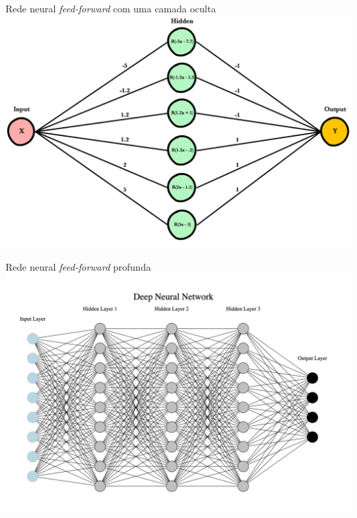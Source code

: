 \documentclass[11pt]{beamer}
\begin{document}
\begin{frame}{Rede neural \textit{feed-forward} com uma camada oculta}
\centering 
\includegraphics[scale=0.25]{graficos/single_layer.png}
\end{frame}

\begin{frame}{Rede neural  \textit{feed-forward}  profunda}
	\centering \includegraphics[scale=0.5]{graficos/deep_neural.png}

\end{frame}
\end{document}
